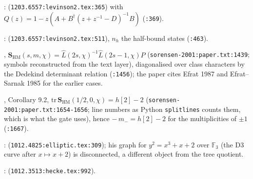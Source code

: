 \begin{citedfact}
\label{cit:cg-h-tail}
\cite{childs2012levinson}: \texttt{} (\texttt{1203.6557:levinson2.tex:365})
with $Q(z) = 1-z(A+B^\dagger(z+z^{-1}-D)^{-1}B)$ (\texttt{:369}).
\end{citedfact}
\begin{citedfact}
\label{cit:cg-levinson}
\cite{childs2012levinson}: \texttt{}
(\texttt{1203.6557:levinson2.tex:511}), $n_h$ the half-bound states (\texttt{:463}).
\end{citedfact}

\begin{citedfact}
\label{cit:sorensen-scattering-matrix}
\cite{sorensen2001eisenstein}, \texttt{}
$\mathbf S_{\mathrm{HM}}(s,m,\chi) = \hat L(2s,\chi)^{-1}\hat L(2s-1,\chi)P$ (\texttt{sorensen-2001:paper.txt:1439}; symbols
reconstructed from the text layer), diagonalised over class characters by the Dedekind determinant
relation (\texttt{:1456}); the paper cites Efrat 1987 and Efrat--Sarnak 1985 for the earlier cases.
\end{citedfact}
\begin{citedfact}
\label{cit:sorensen-central-trace}
\cite{sorensen2001eisenstein}, Corollary 9.2, \texttt{}
$\mathrm{tr}\,\mathbf S_{\mathrm{HM}}(1/2,0,\chi) = h[2]-2$ (\texttt{sorensen-2001:paper.txt:1654-1656}; line numbers as Python
\texttt{splitlines} counts them, which is what the gate uses), hence
\texttt{} $-\,m_- = h[2]-2$ for the multiplicities of $\pm1$ (\texttt{:1667}).
\end{citedfact}

\begin{citedfact}
\label{cit:lorscheid-components}
\cite{lorscheid2010elliptic}: \texttt{}
(\texttt{1012.4825:elliptic.tex:309}); his graph for $y^2 = x^3+x+2$ over $\mathbb F_3$ (the $\mathrm{D3}$
curve after $x\mapsto x+2$) is disconnected, a different object from the tree quotient.
\end{citedfact}
\begin{citedfact}
\label{cit:lorscheid-cusp-count}
\cite{lorscheid2010hecke}: \texttt{}
(\texttt{1012.3513:hecke.tex:992}).
\end{citedfact}
